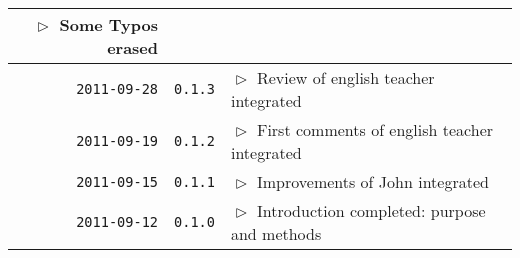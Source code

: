 \begin{table}
\begin{center}
\begin{tabular}{|r|c|p{10cm}|}
    $\vartriangleright$ Some Typos erased\\
\hline
    \texttt{2011-09-28}
  & \texttt{0.1.3} 
  & $\vartriangleright$ Review of english teacher integrated \\
\hline
    \texttt{2011-09-19}
  & \texttt{0.1.2} 
  & $\vartriangleright$ First comments of english teacher integrated \\
\hline
    \texttt{2011-09-15}
  & \texttt{0.1.1} 
  & $\vartriangleright$ Improvements of John integrated\\
\hline
    \texttt{2011-09-12}
  & \texttt{0.1.0} 
  & $\vartriangleright$ Introduction completed: purpose and methods \\
\hline
\hline 
\end{tabular}
\end{center}
\end{table}


%
